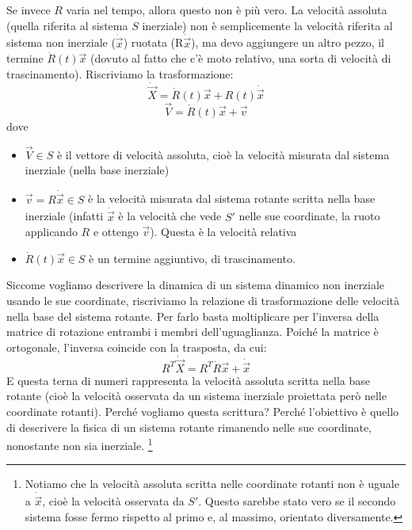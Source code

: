 \documentclass[a4paper,openany]{article}
\begin{document}
	Se invece $R$ varia nel tempo, allora questo non è più vero. La velocità assoluta (quella riferita al sistema $S$ inerziale) non è semplicemente la velocità riferita al sistema non inerziale ($\dot{\vec{x}}$) ruotata (R$\dot{\vec{x}}$), ma devo aggiungere un altro pezzo, il termine $\dot{R}(t)\vec{x}$ (dovuto al fatto che c'è moto relativo, una sorta di velocità di trascinamento). Riscriviamo la trasformazione:
	$$
	\dot{\vec{X}} = \dot{R}(t)\vec{x} + R(t)\dot{\vec{x}}
	$$
	$$
	\vec{V} = \dot{R}(t)\vec{x} + \vec{v}
	$$ 
	dove \begin{itemize}
		\item $\vec{V}\in S$ è il vettore di velocità assoluta, cioè la velocità misurata dal sistema inerziale (nella base inerziale)
		\item $\vec{v} = R\dot{\vec{x}} \in S$ è la velocità misurata dal sistema rotante scritta nella base inerziale (infatti $\dot{\vec{x}}$ è la velocità che vede $S'$ nelle sue coordinate, la ruoto applicando $R$ e ottengo $\vec{v}$). Questa è la velocità relativa
		\item  $\dot{R}(t)\vec{x} \in S$ è un termine aggiuntivo, di trascinamento.
	\end{itemize}
	Siccome vogliamo descrivere la dinamica di un sistema dinamico non inerziale usando le sue coordinate, riscriviamo la relazione di trasformazione delle velocità nella base del sistema rotante. Per farlo basta moltiplicare per l'inversa della matrice di rotazione entrambi i membri dell'uguaglianza. Poiché la matrice è ortogonale, l'inversa coincide con la trasposta, da cui:
	\begin{equation}
		R^{T}\dot{\vec{X}} = R^{T}\dot{R}\vec{x} + \dot{\vec{x}}
		\label{VelAss}
	\end{equation}
	E questa terna di numeri rappresenta la velocità assoluta scritta nella base rotante (cioè la velocità osservata da un sistema inerziale proiettata però nelle coordinate rotanti). Perché vogliamo questa scrittura? Perché l'obiettivo è quello di descrivere la fisica di un sistema rotante rimanendo nelle sue coordinate, nonostante non sia inerziale.
	\footnote{Notiamo che la velocità assoluta scritta nelle coordinate rotanti non è uguale a $\dot{\vec{x}}$, cioè la velocità osservata da $S'$. Questo sarebbe stato vero se il secondo sistema fosse fermo rispetto al primo e, al massimo, orientato diversamente.}
	
\end{document}
